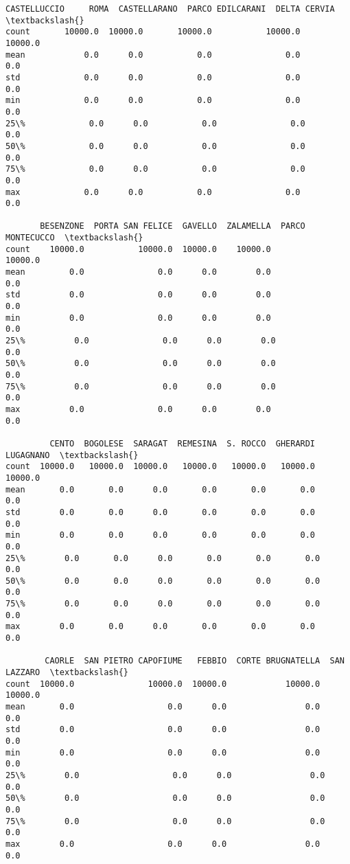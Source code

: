 \documentclass[11pt]{article}
\makeatletter
\newcommand{\boxspacing}{\kern\kvtcb@left@rule\kern\kvtcb@boxsep}
\newcommand{\prompt}[4]{
        {\ttfamily\llap{{\color{#2}[#3]:\hspace{3pt}#4}}\vspace{-\baselineskip}}
    }
\makeatother
\begin{document}
            \begin{tcolorbox}[breakable, size=fbox, boxrule=.5pt, pad at break*=1mm, opacityfill=0]
\prompt{Out}{outcolor}{25}{\boxspacing}
\begin{Verbatim}[commandchars=\\\{\}]
       CASTELLUCCIO     ROMA  CASTELLARANO  PARCO EDILCARANI  DELTA CERVIA  \textbackslash{}
count       10000.0  10000.0       10000.0           10000.0       10000.0
mean            0.0      0.0           0.0               0.0           0.0
std             0.0      0.0           0.0               0.0           0.0
min             0.0      0.0           0.0               0.0           0.0
25\%             0.0      0.0           0.0               0.0           0.0
50\%             0.0      0.0           0.0               0.0           0.0
75\%             0.0      0.0           0.0               0.0           0.0
max             0.0      0.0           0.0               0.0           0.0

       BESENZONE  PORTA SAN FELICE  GAVELLO  ZALAMELLA  PARCO MONTECUCCO  \textbackslash{}
count    10000.0           10000.0  10000.0    10000.0           10000.0
mean         0.0               0.0      0.0        0.0               0.0
std          0.0               0.0      0.0        0.0               0.0
min          0.0               0.0      0.0        0.0               0.0
25\%          0.0               0.0      0.0        0.0               0.0
50\%          0.0               0.0      0.0        0.0               0.0
75\%          0.0               0.0      0.0        0.0               0.0
max          0.0               0.0      0.0        0.0               0.0

         CENTO  BOGOLESE  SARAGAT  REMESINA  S. ROCCO  GHERARDI  LUGAGNANO  \textbackslash{}
count  10000.0   10000.0  10000.0   10000.0   10000.0   10000.0    10000.0
mean       0.0       0.0      0.0       0.0       0.0       0.0        0.0
std        0.0       0.0      0.0       0.0       0.0       0.0        0.0
min        0.0       0.0      0.0       0.0       0.0       0.0        0.0
25\%        0.0       0.0      0.0       0.0       0.0       0.0        0.0
50\%        0.0       0.0      0.0       0.0       0.0       0.0        0.0
75\%        0.0       0.0      0.0       0.0       0.0       0.0        0.0
max        0.0       0.0      0.0       0.0       0.0       0.0        0.0

        CAORLE  SAN PIETRO CAPOFIUME   FEBBIO  CORTE BRUGNATELLA  SAN LAZZARO  \textbackslash{}
count  10000.0               10000.0  10000.0            10000.0      10000.0
mean       0.0                   0.0      0.0                0.0          0.0
std        0.0                   0.0      0.0                0.0          0.0
min        0.0                   0.0      0.0                0.0          0.0
25\%        0.0                   0.0      0.0                0.0          0.0
50\%        0.0                   0.0      0.0                0.0          0.0
75\%        0.0                   0.0      0.0                0.0          0.0
max        0.0                   0.0      0.0                0.0          0.0


\end{Verbatim}
\end{tcolorbox}
\end{document}
